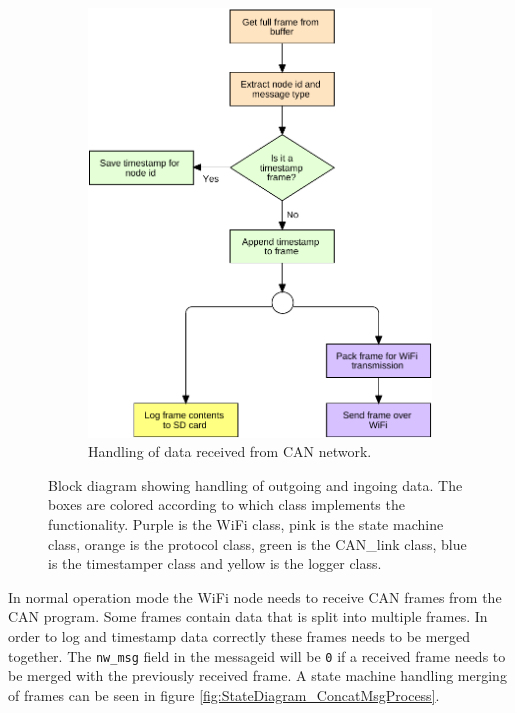 \begin{figure}[!h]
\begin{subfigure}[b]{0.52\textwidth}
\includegraphics[width=1\textwidth]{graphics/FlowChart_CANFrameProcess}
\caption{Handling of data received from CAN network.}
\label{fig:FlowChart_CANFrameProcess}
\end{subfigure}
\caption{Block diagram showing handling of outgoing and ingoing data. The boxes are colored according to which class implements the functionality. Purple is the WiFi class, pink is the state machine class, orange is the protocol class, green is the CAN\_link class, blue is the timestamper class and yellow is the logger class.}
\label{fig:wifi_flow}
\end{figure}

In normal operation mode the WiFi node needs to receive CAN frames from the CAN program. 
Some frames contain data that is split into multiple frames.
In order to log and timestamp data correctly these frames needs to be merged together.
The \texttt{nw\_msg} field in the messageid will be \texttt{0} if a received frame needs to be merged with the previously received frame.
A state machine handling merging of frames can be seen in figure \ref{fig:StateDiagram_ConcatMsgProcess}.

